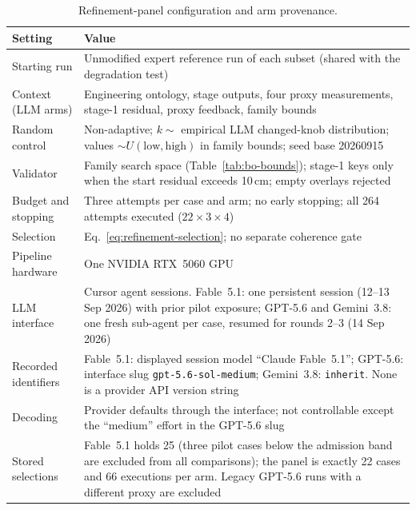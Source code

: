 \documentclass[a4paper,fleqn]{cas-dc}
\begin{document}
\begin{table}[t]
\caption{Refinement-panel configuration and arm provenance.}
\label{tab:poc-config}
\centering
\small
\begin{tabular*}{\textwidth}{@{\extracolsep{\fill}} L{0.20\textwidth} L{0.74\textwidth}}
\toprule
Setting & Value \\
\midrule
Starting run & Unmodified expert reference run of each subset (shared with the degradation test) \\
Context (LLM arms) & Engineering ontology, stage outputs, four proxy measurements, stage-1 residual, proxy feedback, family bounds \\
Random control & Non-adaptive; $k\sim$ empirical LLM changed-knob distribution; values $\sim U(\mathrm{low},\mathrm{high})$ in family bounds; seed base 20260915 \\
Validator & Family search space (Table~\ref{tab:bo-bounds}); stage-1 keys only when the start residual exceeds 10\,cm; empty overlays rejected \\
Budget and stopping & Three attempts per case and arm; no early stopping; all 264 attempts executed ($22\times3\times4$) \\
Selection & Eq.~\eqref{eq:refinement-selection}; no separate coherence gate \\
Pipeline hardware & One NVIDIA RTX~5060 GPU \\
\midrule
LLM interface & Cursor agent sessions. Fable~5.1: one persistent session (12--13 Sep 2026) with prior pilot exposure; GPT-5.6 and Gemini~3.8: one fresh sub-agent per case, resumed for rounds 2--3 (14 Sep 2026) \\
Recorded identifiers & Fable~5.1: displayed session model ``Claude Fable~5.1''; GPT-5.6: interface slug \texttt{gpt-5.6-sol-medium}; Gemini~3.8: \texttt{inherit}. None is a provider API version string \\
Decoding & Provider defaults through the interface; not controllable except the ``medium'' effort in the GPT-5.6 slug \\
Stored selections & Fable~5.1 holds 25 (three pilot cases below the admission band are excluded from all comparisons); the panel is exactly 22 cases and 66 executions per arm. Legacy GPT-5.6 runs with a different proxy are excluded \\
\bottomrule
\end{tabular*}
\end{table}
\end{document}
